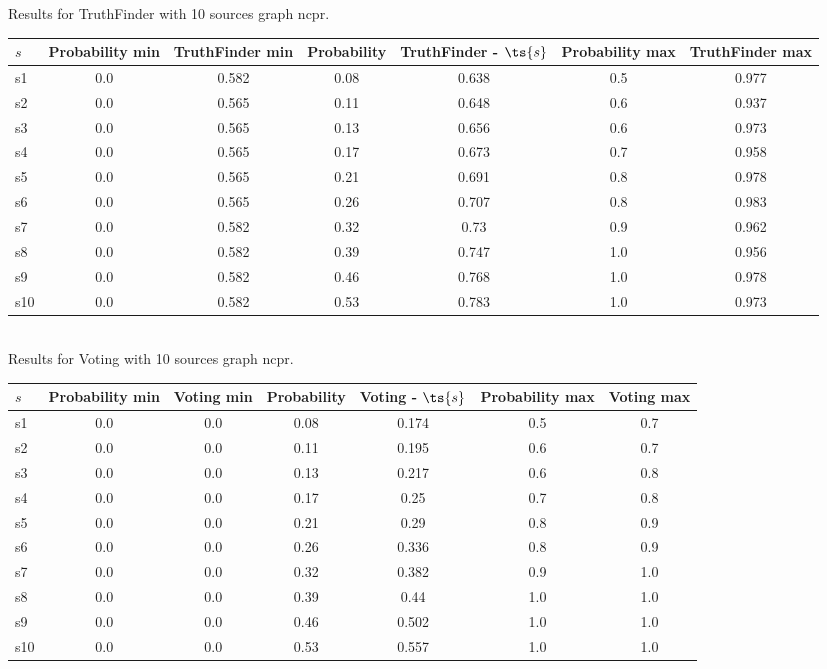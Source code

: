 \documentclass{article}
\begin{document}
\noindent Results for TruthFinder with 10 sources graph ncpr.

\noindent\begin{tabular}{|l|c|c|c|c|c|c|}
\hline
$s$& Probability min & TruthFinder min & Probability & TruthFinder - $\ts{s}$ & Probability max & TruthFinder max\\
\hline
s1 &0.0 & 0.582 & 0.08 & 0.638 & 0.5 & 0.977\\
\hline
s2 &0.0 & 0.565 & 0.11 & 0.648 & 0.6 & 0.937\\
\hline
s3 &0.0 & 0.565 & 0.13 & 0.656 & 0.6 & 0.973\\
\hline
s4 &0.0 & 0.565 & 0.17 & 0.673 & 0.7 & 0.958\\
\hline
s5 &0.0 & 0.565 & 0.21 & 0.691 & 0.8 & 0.978\\
\hline
s6 &0.0 & 0.565 & 0.26 & 0.707 & 0.8 & 0.983\\
\hline
s7 &0.0 & 0.582 & 0.32 & 0.73 & 0.9 & 0.962\\
\hline
s8 &0.0 & 0.582 & 0.39 & 0.747 & 1.0 & 0.956\\
\hline
s9 &0.0 & 0.582 & 0.46 & 0.768 & 1.0 & 0.978\\
\hline
s10 &0.0 & 0.582 & 0.53 & 0.783 & 1.0 & 0.973\\
\hline
\end{tabular}\\

\noindent Results for Voting with 10 sources graph ncpr.

\noindent\begin{tabular}{|l|c|c|c|c|c|c|}
\hline
$s$& Probability min & Voting min & Probability & Voting - $\ts{s}$ & Probability max & Voting max\\
\hline
s1 &0.0 & 0.0 & 0.08 & 0.174 & 0.5 & 0.7\\
\hline
s2 &0.0 & 0.0 & 0.11 & 0.195 & 0.6 & 0.7\\
\hline
s3 &0.0 & 0.0 & 0.13 & 0.217 & 0.6 & 0.8\\
\hline
s4 &0.0 & 0.0 & 0.17 & 0.25 & 0.7 & 0.8\\
\hline
s5 &0.0 & 0.0 & 0.21 & 0.29 & 0.8 & 0.9\\
\hline
s6 &0.0 & 0.0 & 0.26 & 0.336 & 0.8 & 0.9\\
\hline
s7 &0.0 & 0.0 & 0.32 & 0.382 & 0.9 & 1.0\\
\hline
s8 &0.0 & 0.0 & 0.39 & 0.44 & 1.0 & 1.0\\
\hline
s9 &0.0 & 0.0 & 0.46 & 0.502 & 1.0 & 1.0\\
\hline
s10 &0.0 & 0.0 & 0.53 & 0.557 & 1.0 & 1.0\\
\hline
\end{tabular}\\
\end{document}
